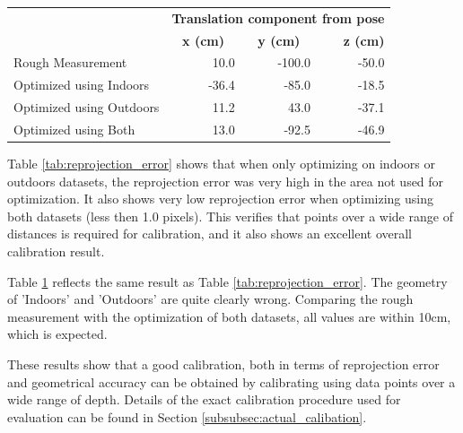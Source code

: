 
\begin{table}[H]
    \begin{tabular}{ p{6cm} r r r} %
    \toprule
    & \multicolumn{3}{r}{\bf{Translation component from pose}}  \\
    & \multicolumn{1}{c}{\hspace*{1cm}\bf{x (cm)}} & \multicolumn{1}{c}{\hspace*{1cm}\bf{y (cm)}} & \hspace*{1cm}\bf{z (cm)} \\
    \midrule
    Rough Measurement & 10.0 & -100.0 & -50.0 \\
    Optimized using Indoors & -36.4 & -85.0 & -18.5\\
    Optimized using Outdoors & 11.2 & 43.0 & -37.1 \\
    Optimized using Both & 13.0 & -92.5 & -46.9 \\ 
    \bottomrule
    \end{tabular}
  \label{tab:geometry}
\end{table}

Table \ref{tab:reprojection_error} shows that when only optimizing on indoors or outdoors datasets, the reprojection error was very high in the area not used for optimization.  It also shows very low reprojection error when optimizing using both datasets (less then 1.0 pixels).  This verifies that points over a wide range of distances is required for calibration, and it also shows an excellent overall calibration result.

Table \ref{tab:geometry} reflects the same result as Table \ref{tab:reprojection_error}.  The geometry of 'Indoors' and 'Outdoors' are quite clearly wrong.  Comparing the rough measurement with the optimization of both datasets, all values are within 10cm, which is expected.

These results show that a good calibration, both in terms of reprojection error and geometrical accuracy can be obtained by calibrating using data points over a wide range of depth. Details of the exact calibration procedure used for evaluation can be found in Section \ref{subsubsec:actual_calibation}.

